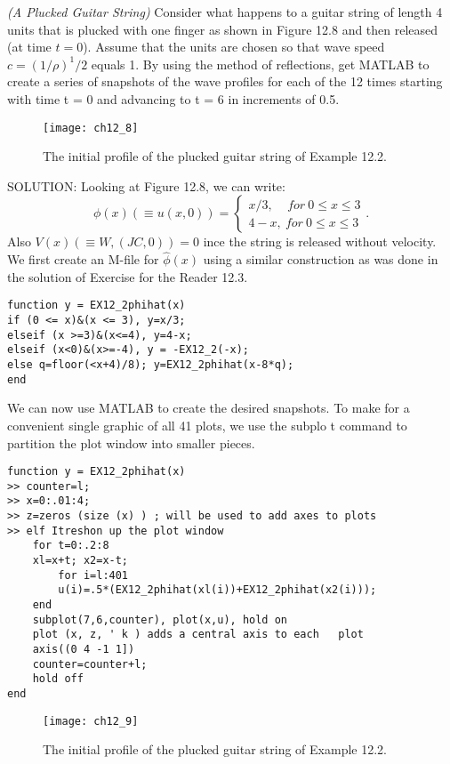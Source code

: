 \documentclass[../main.tex]{subfiles}
\begin{document}
{\textit{(A Plucked Guitar String)} 
Consider what happens to a guitar string of length 4 units that is plucked with one finger as shown in Figure 12.8 and then released (at time  $t = 0$). Assume that the units are chosen so that wave speed $ c=(1/ \rho )^1/2 $ equals 1. By using the method of reflections, get MATLAB to create a series of snapshots of the wave profiles for each of the 12 times starting with time t = 0 and advancing to t = 6 in increments of 0.5. 
\begin{figure}[H]
	\centering
	\texttt{[image: ch12\_8]}
	\caption{\textsf{ The initial profile of the plucked guitar string of Example 12.2.}}
	\label{pfig:ch12_8}
\end{figure}
SOLUTION: Looking at Figure 12.8, we can write: 
$$
\phi(x) (\equiv u(x,0)) =
\begin{cases}
x/3, ~~~~~for~ 0 \leqslant x \leqslant 3 \\
4 - x, ~for~ 0\leqslant x \leqslant 3 
\end{cases} .
$$
Also $V(x)(\equiv W,(JC,0)) = 0$ ince the string is released without velocity. We first 
create an M-file for $ \hat{\phi}(x)$ using a similar construction as was done in the solution 
of Exercise for the Reader 12.3. 
\begin{verbatim}
function y = EX12_2phihat(x) 
if (0 <= x)&(x <= 3), y=x/3; 
elseif (x >=3)&(x<=4), y=4-x; 
elseif (x<0)&(x>=-4), y = -EX12_2(-x); 
else q=floor(<x+4)/8); y=EX12_2phihat(x-8*q); 
end 
\end{verbatim}
We can now use MATLAB to create the desired snapshots. To make for a 
convenient single graphic of all 41 plots, we use the subplo t command to 
partition the plot window into smaller pieces. 
\\
\begin{lstlisting}[numbers=none,frame=none]
function y = EX12_2phihat(x) 
>> counter=l; 
>> x=0:.01:4; 
>> z=zeros (size (x) ) ; will be used to add axes to plots 
>> elf Itreshon up the plot window 
	for t=0:.2:8 
	xl=x+t; x2=x-t; 
		for i=l:401 
		u(i)=.5*(EX12_2phihat(xl(i))+EX12_2phihat(x2(i))); 
	end 
	subplot(7,6,counter), plot(x,u), hold on 
	plot (x, z, ' k ) adds a central axis to each 	plot 
	axis((0 4 -1 1]) 
	counter=counter+l; 
	hold off 
end
\end{lstlisting}
\begin{figure}[H]
	\centering
	\texttt{[image: ch12\_9]}
	\caption{\textsf{ The initial profile of the plucked guitar string of Example 12.2.}}
	\label{pfig:ch12_9}
\end{figure}
}
\end{document}
